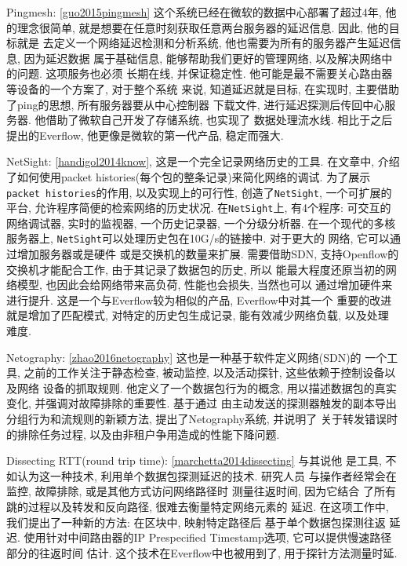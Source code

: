 {\begin{mdframed}[everyline=true]
Pingmesh: \ref{guo2015pingmesh}
这个系统已经在微软的数据中心部署了超过4年, 他的理念很简单,
就是想要在任意时刻获取任意两台服务器的延迟信息. 因此, 他的目标就是
去定义一个网络延迟检测和分析系统, 他也需要为所有的服务器产生延迟信息,
因为延迟数据 属于基础信息, 能够帮助我们更好的管理网络,
以及解决网络中的问题. 这项服务也必须 长期在线, 并保证稳定性.
他可能是最不需要关心路由器等设备的一个方案了, 对于整个系统 来说,
知道延迟就是目标, 在实现时, 主要借助了ping的思想,
所有服务器要从中心控制器 下载文件, 进行延迟探测后传回中心服务器.
他借助了微软自己开发了存储系统, 也实现了 数据处理流水线.
相比于之后提出的Everflow, 他更像是微软的第一代产品, 稳定而强大.

NetSight: \ref{handigol2014know}, 这是一个完全记录网络历史的工具.
在文章中, 介绍了如何使用packet
histories(每个包的整条记录)来简化网络的调试.
为了展示\texttt{packet\ histories}的作用, 以及实现上的可行性,
创造了\texttt{NetSight}, 一个可扩展的平台,
允许程序简便的检索网络的历史状况. 在\texttt{NetSight}上, 有4个程序:
可交互的网络调试器, 实时的监视器, 一个历史记录器, 一个分级分析器.
在一个现代的多核服务器上,
\texttt{NetSight}可以处理历史包在10G/s的链接中. 对于更大的 网络,
它可以通过增加服务器或是硬件 或是交换机的数量来扩展. 需要借助SDN,
支持Openflow的交换机才能配合工作, 由于其记录了数据包的历史, 所以
能最大程度还原当初的网络模型, 也因此会给网络带来高负荷, 性能也会损失,
当然也可以 通过增加硬件来进行提升. 这是一个与Everflow较为相似的产品,
Everflow中对其一个 重要的改进就是增加了匹配模式, 对特定的历史包生成记录,
能有效减少网络负载, 以及处理 难度.

Netography: \ref{zhao2016netography} 这也是一种基于软件定义网络(SDN)的
一个工具, 之前的工作关注于静态检查, 被动监控, 以及活动探针,
这些依赖于控制设备以及网络 设备的抓取规则. 他定义了一个数据包行为的概念,
用以描述数据包的真实变化, 并强调对故障排除的重要性. 基于通过
由主动发送的探测器触发的副本导出分组行为和流规则的新颖方法,
提出了Netography系统, 并说明了 关于转发错误时的排除任务过程,
以及由非租户争用造成的性能下降问题.

Dissecting RTT(round trip time): \ref{marchetta2014dissecting} 与其说他
是工具, 不如认为这一种技术, 利用单个数据包探测延迟的技术. 研究人员
与操作者经常会在监控, 故障排除, 或是其他方式访问网络路径时 测量往返时间,
因为它结合 了所有跳的过程以及转发和反向路径, 很难去衡量特定网络元素的
延迟. 在这项工作中, 我们提出了一种新的方法: 在区块中, 映射特定路径后
基于单个数据包探测往返 延迟. 使用针对中间路由器的IP Prespecified
Timestamp选项, 它可以提供慢速路径部分的往返时间 估计.
这个技术在Everflow中也被用到了, 用于探针方法测量时延.


\end{mdframed}}
